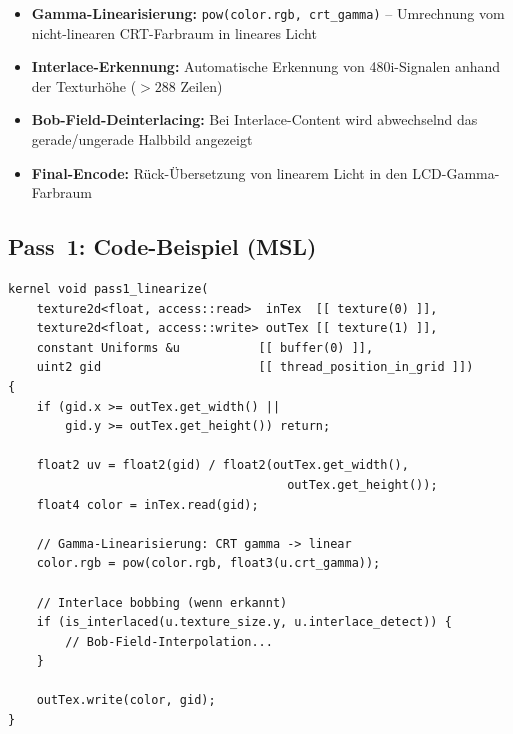 \documentclass[11pt, a4paper]{article}
\begin{document}
\begin{itemize}[leftmargin=*, nosep]
    \item \textbf{Gamma-Linearisierung:} \vspace{.25cm} \newline \texttt{pow(color.rgb, crt\_gamma)} -- Umrechnung vom nicht-linearen CRT-Farbraum \newline in lineares Licht \\
    \item \textbf{Interlace-Erkennung:} \vspace{.25cm} \newline Automatische Erkennung von 480i-Signalen anhand der Texturh\"ohe ($> 288$ Zeilen) \\
    \item \textbf{Bob-Field-Deinterlacing:} \vspace{.25cm} \newline Bei Interlace-Content wird abwechselnd das gerade/ungerade Halbbild angezeigt \\
    \item \textbf{Final-Encode:} \vspace{.25cm} \newline R\"uck-\"Ubersetzung von linearem Licht in den LCD-Gamma-Farbraum
\end{itemize}

\newpage \vspace*{-.75cm}
\subsection{Pass~1: Code-Beispiel (MSL)}
\vspace{.5cm}

\begin{lstlisting}[language=Metal, caption={Pass~1 -- Linearize-Kernel (vereinfacht)}]
kernel void pass1_linearize(
    texture2d<float, access::read>  inTex  [[ texture(0) ]],
    texture2d<float, access::write> outTex [[ texture(1) ]],
    constant Uniforms &u           [[ buffer(0) ]],
    uint2 gid                      [[ thread_position_in_grid ]])
{
    if (gid.x >= outTex.get_width() ||
        gid.y >= outTex.get_height()) return;

    float2 uv = float2(gid) / float2(outTex.get_width(),
                                       outTex.get_height());
    float4 color = inTex.read(gid);

    // Gamma-Linearisierung: CRT gamma -> linear
    color.rgb = pow(color.rgb, float3(u.crt_gamma));

    // Interlace bobbing (wenn erkannt)
    if (is_interlaced(u.texture_size.y, u.interlace_detect)) {
        // Bob-Field-Interpolation...
    }

    outTex.write(color, gid);
}
\end{lstlisting}
\end{document}
